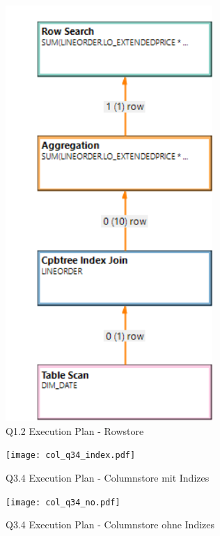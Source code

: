 \begin{figure}[H]
	\centering
	\includegraphics[width=0.7\textwidth]{images/q1-2-row-exec.png}
	\caption{Q1.2 Execution Plan - Rowstore}\label{exec:q1.2-row}
\end{figure}

\graphicspath{{images/indizes/}}

\begin{figure}[H]
	\centering
	\texttt{[image: col\_q34\_index.pdf]}
	\caption{Q3.4 Execution Plan - Columnstore mit Indizes}\label{exec:q34-col-index}
\end{figure}

\begin{figure}[H]
	\centering
	\texttt{[image: col\_q34\_no.pdf]}
	\caption{Q3.4 Execution Plan - Columnstore ohne Indizes}\label{exec:q3.4-col-no}
\end{figure}

